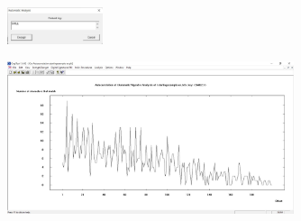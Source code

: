 \documentclass{article}
\begin{document}
\begin{figure}[H]
    \centering
    \includegraphics[width=0.25\textwidth]{figures/4c.jpg}
    \caption
	{}
    \label{fig:fig1}
\end{figure}

\begin{figure}[H]
    \centering
    \includegraphics[width=0.75\textwidth]{figures/4d.jpg}
    \caption
	{}
    \label{fig:fig1}
\end{figure}
\end{document}

